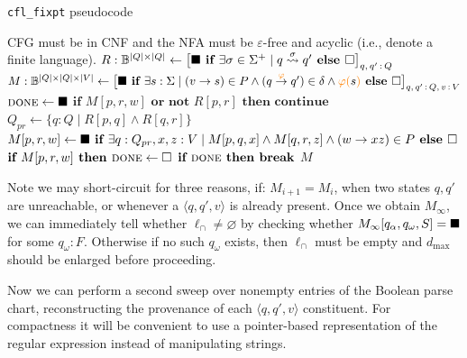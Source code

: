 \documentclass[sigplan,review,acmsmall,nonacm,screen,anonymous]{acmart}\settopmatter{printfolios=false,printccs=false,printacmref=false}
\begin{document}
\begin{algorithm}[H]
\caption{\texttt{cfl\_fixpt} pseudocode}
\label{alg:cfl_fixpt}
\begin{algorithmic}[1]
\Require CFG must be in CNF and the NFA must be $\varepsilon$-free and acyclic (i.e., denote a finite language).
\State $R: \mathbb{B}^{|Q|\times |Q|} \gets \big[\blacksquare \textbf{ if } \exists \sigma \in \Sigma^+ \mid q \overset{\sigma}{\rightsquigarrow} q' \textbf{ else } \square\big]_{q,\,q'\,:\, Q}$ 
\State $M: \mathbb{B}^{|Q|\times |Q| \times |V|} \gets \big[\blacksquare \textbf{ if } \exists s: \Sigma \mid (v \rightarrow s) \in P \land (q \overset{{\color{orange}\varphi}}{\rightarrow} q') \in \delta \land {\color{orange}\varphi(}s{\color{orange})} \textbf{ else } \square\big]_{q,\,q'\,:\,Q,\,v\,:\,V}$
 
\State $\textsc{done} \gets \blacksquare$
 
  \State $\textbf{if } M[p, r, w] \textbf{ or not } R[p, r] \textbf{ then continue}$
  \State $Q_{pr} \gets \big\{q: Q \mid R[p, q] \land R[q, r]\big\}$ 
  \State $M[p, r, w] \gets \blacksquare \textbf{ if } \exists q: Q_{pr}, x, z: V \mid M[p, q, x] \land M[q, r, z] \land (w \rightarrow x z) \in P \textbf { else } \square$
  \State $\textbf{if } M[p, r, w] \textbf{ then } \textsc{done} \gets \square$
\EndFor
\State $\textbf{if }\textsc{done} \textbf{ then break}$
\EndFor
\State \Return $M$ 
  \end{algorithmic}
\end{algorithm}\vspace{-0.2cm}

\noindent Note we may short-circuit for three reasons, if: $M_{i+1} = M_i$, when two states $q, q'$ are unreachable, or whenever a $\langle q, q', v\rangle$ is already present. Once we obtain $M_\infty$, we can immediately tell whether $\ell_\cap \neq \varnothing$ by checking whether $M_\infty[q_\alpha, q_\omega, S] = \blacksquare$ for some $q_\omega: F$. Otherwise if no such $q_\omega$ exists, then $\ell_\cap$ must be empty and $d_\max$ should be enlarged before proceeding.

\noindent Now we can perform a second sweep over nonempty entries of the Boolean parse chart, reconstructing the provenance of each $\langle q, q', v\rangle$ constituent. For compactness it will be convenient to use a pointer-based representation of the regular expression instead of manipulating strings.
\end{document}
